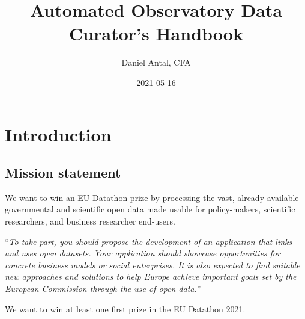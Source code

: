 \documentclass[
  a4paper,
  openany, a4paper, oneside]{book}
\title{Automated Observatory Data Curator's Handbook}
\author{Daniel Antal, CFA}
\date{2021-05-16}
\begin{document}
\maketitle

{
\hypersetup{linkcolor=}
\setcounter{tocdepth}{1}
\tableofcontents
}
\listoffigures
{}
\hypertarget{introduction}{%
\chapter*{Introduction}\label{introduction}}

\hypertarget{mission-statement}{%
\section*{Mission statement}\label{mission-statement}}

We want to win an \href{https://op.europa.eu/en/web/eudatathon}{EU Datathon prize} by processing the vast, already-available governmental and scientific open data made usable for policy-makers, scientific researchers, and business researcher end-users.

``\emph{To take part, you should propose the development of an application that links and uses open datasets. Your application should showcase opportunities for concrete business models or social enterprises. It is also expected to find suitable new approaches and solutions to help Europe achieve important goals set by the European Commission through the use of open data.}''

We want to win at least one first prize in the EU Datathon 2021.
\end{document}
